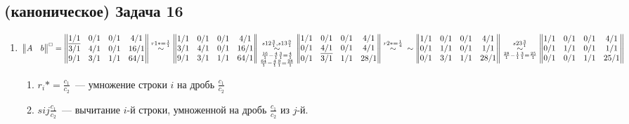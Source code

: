 \documentclass[a4paper]{article}
\begin{document}
\subsection*{(каноническое) Задача 16}
\begin{enumerate}
\item $\begin{Vmatrix}
A & b
\end{Vmatrix}^\Box=\begin{Vmatrix}
\underline{1/1} & 0/1 & 0/1 & 4/1\\
3/1 & 4/1 & 0/1 & 16/1\\
9/1 & 3/1 & 1/1 & 64/1\\
\end{Vmatrix}
\overset{r1 *= \frac{1}{1}}{\sim}
\begin{Vmatrix}
1/1 & 0/1 & 0/1 & 4/1\\
3/1 & 4/1 & 0/1 & 16/1\\
9/1 & 3/1 & 1/1 & 64/1\\
\end{Vmatrix}
\underset{\substack{\frac{16}{1}-\frac{4}{1}\frac{3}{1}=\frac{4}{1}\\\frac{64}{1}-\frac{4}{1}\frac{9}{1}=\frac{28}{1}}}{\overset{s 1 2 \frac{3}{1}, s 1 3 \frac{9}{1}}{\sim}}
\begin{Vmatrix}
1/1 & 0/1 & 0/1 & 4/1\\
0/1 & \underline{4/1} & 0/1 & 4/1\\
0/1 & 3/1 & 1/1 & 28/1\\
\end{Vmatrix}
\overset{r2 *= \frac{1}{4}}{\sim}\newline\sim
\begin{Vmatrix}
1/1 & 0/1 & 0/1 & 4/1\\
0/1 & 1/1 & 0/1 & 1/1\\
0/1 & 3/1 & 1/1 & 28/1\\
\end{Vmatrix}
\underset{\frac{28}{1}-\frac{1}{1}\frac{3}{1}=\frac{25}{1}}{\overset{s 2 3 \frac{3}{1}}{\sim}}
\begin{Vmatrix}
1/1 & 0/1 & 0/1 & 4/1\\
0/1 & 1/1 & 0/1 & 1/1\\
0/1 & 0/1 & 1/1 & 25/1\\
\end{Vmatrix}
$
\begin{enumerate}
\item $r_i *= \frac{c_1}{c_2}$~--- умножение строки $i$ на дробь $\frac{c_1}{c_2}$
\item $s i j \frac{c_1}{c_2}$~--- вычитание $i$-й строки, умноженной на дробь $\frac{c_1}{c_2}$ из $j$-й.
\end{enumerate}
\end{enumerate}
\end{document}
